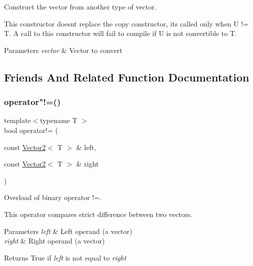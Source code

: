 Construct the vector from another type of vector. 

This constructor doesn\textquotesingle{}t replace the copy constructor, it\textquotesingle{}s called only when U != T. A call to this constructor will fail to compile if U is not convertible to T.


\begin{DoxyParams}{Parameters}
{\em vector} & Vector to convert \\
\hline
\end{DoxyParams}


\subsection{Friends And Related Function Documentation}
\mbox{\label{classsf_1_1_vector2_a01673da35ef9c52d0e54b8263549a956}} 
\subsubsection{\texorpdfstring{operator"!=()}{operator!=()}}
{\footnotesize\ttfamily template$<$typename T $>$ \\
bool operator!= (\begin{DoxyParamCaption}\item[{const \hyperlink{classsf_1_1_vector2}{Vector2}$<$ T $>$ \&}]{left,  }\item[{const \hyperlink{classsf_1_1_vector2}{Vector2}$<$ T $>$ \&}]{right }\end{DoxyParamCaption})\hspace{0.3cm}{\ttfamily [related]}}



Overload of binary operator !=. 

This operator compares strict difference between two vectors.


\begin{DoxyParams}{Parameters}
{\em left} & Left operand (a vector) \\
\hline
{\em right} & Right operand (a vector)\\
\hline
\end{DoxyParams}
\begin{DoxyReturn}{Returns}
True if {\itshape left} is not equal to {\itshape right} 
\end{DoxyReturn}
\mbox{\label{classsf_1_1_vector2_a5f48ca928995b41c89f155afe8d16b02}} 
